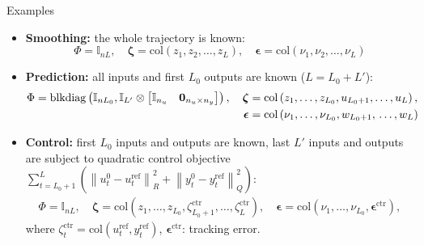 \documentclass[smaller,aspectratio=169]{beamer}        %
\newcommand{\norm}[1]{\left\lVert#1\right\rVert}
\newcommand{\col}[1]{\mathrm{col}\left(#1\right)}
\newcommand{\blkdiag}[1]{\mathrm{blkdiag}\left(#1\right)}
\begin{document}
\begin{frame}{Examples}
\begin{itemize}
    \item \textbf{Smoothing:} the whole trajectory is known:
    \[\Phi=\mathbb{I}_{nL},\quad\boldsymbol{\zeta}=\col{z_1,z_2,\dots,z_L},\quad\boldsymbol{\epsilon}=\col{\nu_1,\nu_2,\dots,\nu_L}\]
    \item \textbf{Prediction:} all inputs and first $L_0$ outputs are known ($L=L_0+L'$):
    \begin{align*}
    \Phi=\blkdiag{\mathbb{I}_{nL_0},\mathbb{I}_{L'}\otimes\begin{bmatrix}
    \mathbb{I}_{n_u}&\mathbf{0}_{n_u\times n_y}
\end{bmatrix}},\quad
    \boldsymbol{\zeta}&=\col{z_1  ,\dots,z_{L_0},u_{L_0+1},\dots,u_L},\\
    \boldsymbol{\epsilon}&=\textrm{col}\,(\nu_1,\dots,\nu_{L_0},w_{L_0+1},\newline\dots,w_L)
\end{align*}
    \item \textbf{Control:} first $L_0$ inputs and outputs are known, last $L'$ inputs and outputs are subject to quadratic control objective $\sum_{t=L_0+1}^L\left(\norm{u_t^0-u_t^\mathrm{ref}}_R^2+\norm{y_t^0-y_t^\mathrm{ref}}_Q^2\right)$:
    \begin{align*}
    \Phi=\mathbb{I}_{nL},\quad\boldsymbol{\zeta}=\col{z_1,\dots,z_{L_0}  ,\zeta_{L_0+1}^\mathrm{ctr},\dots,\zeta_L^\mathrm{ctr}},\quad\boldsymbol{\epsilon}=\col{\nu_1,\dots,\nu_{L_0},\boldsymbol{\epsilon}^\mathrm{ctr}},
    \end{align*}
    where $\zeta_t^\mathrm{ctr}=\col{u_t^\mathrm{ref},y_t^\mathrm{ref}}$, $\boldsymbol{\epsilon}^\mathrm{ctr}$: tracking error.
\end{itemize}
\end{frame}
\end{document}
